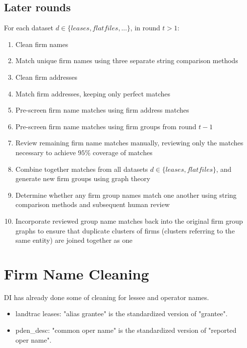 \documentclass{article}
\begin{document}
\subsection{Later rounds}
For each dataset $d \in \{leases, flatfiles, ... \}$, in round $t > 1$:
\begin{enumerate}
    \item Clean firm names 
    
    \item Match unique firm names using three separate string comparison methods
    
    \item Clean firm addresses 
    
    \item Match firm addresses, keeping only perfect matches

    \item Pre-screen firm name matches using firm address matches
    
    \item Pre-screen firm name matches using firm groups from round $t - 1$
    
    \item Review remaining firm name matches manually, reviewing only the matches necessary to achieve $95\%$ coverage of matches
    
    \item Combine together matches from all datasets $d \in \{leases, flatfiles\}$, and generate new firm groups using graph theory
    
    \item Determine whether any firm group names match one another using string comparison methods and subsequent human review
    
    \item Incorporate reviewed group name matches back into the original firm group graphs to ensure that duplicate clusters of firms (clusters referring to the same entity) are joined together as one 
\end{enumerate}

\section{Firm Name Cleaning}

DI has already done some of cleaning for lessee and operator names.
\begin{itemize}
    \item landtrac leases: "alias grantee" is the standardized version of "grantee".
    \item pden\_desc: "common oper name" is the standardized version of "reported oper name".
\end{itemize}
\end{document}
